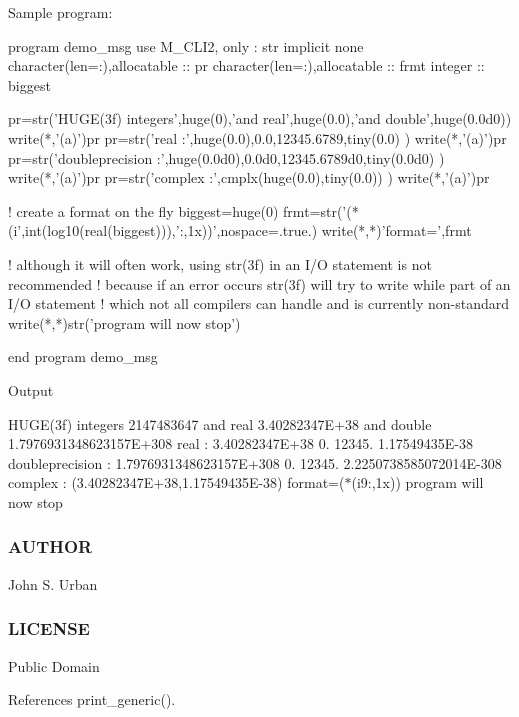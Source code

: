 Sample program\+: \begin{DoxyVerb}  program demo_msg
  use M_CLI2, only : str
  implicit none
  character(len=:),allocatable :: pr
  character(len=:),allocatable :: frmt
  integer                      :: biggest

  pr=str('HUGE(3f) integers',huge(0),'and real',huge(0.0),'and double',huge(0.0d0))
  write(*,'(a)')pr
  pr=str('real            :',huge(0.0),0.0,12345.6789,tiny(0.0) )
  write(*,'(a)')pr
  pr=str('doubleprecision :',huge(0.0d0),0.0d0,12345.6789d0,tiny(0.0d0) )
  write(*,'(a)')pr
  pr=str('complex         :',cmplx(huge(0.0),tiny(0.0)) )
  write(*,'(a)')pr

  ! create a format on the fly
  biggest=huge(0)
  frmt=str('(*(i',int(log10(real(biggest))),':,1x))',nospace=.true.)
  write(*,*)'format=',frmt

  ! although it will often work, using str(3f) in an I/O statement is not recommended
  ! because if an error occurs str(3f) will try to write while part of an I/O statement
  ! which not all compilers can handle and is currently non-standard
  write(*,*)str('program will now stop')

  end program demo_msg
\end{DoxyVerb}


Output

H\+U\+G\+E(3f) integers 2147483647 and real 3.\+40282347E+38 and double 1.\+7976931348623157E+308 real \+: 3.\+40282347E+38 0. 12345. 1.\+17549435E-\/38 doubleprecision \+: 1.\+7976931348623157E+308 0. 12345. 2.\+2250738585072014E-\/308 complex \+: (3.\+40282347E+38,1.\+17549435E-\/38) format=($\ast$(i9\+:,1x)) program will now stop

\subsubsection*{A\+U\+T\+H\+OR}

John S. Urban \subsubsection*{L\+I\+C\+E\+N\+SE}

Public Domain 

References print\+\_\+generic().

